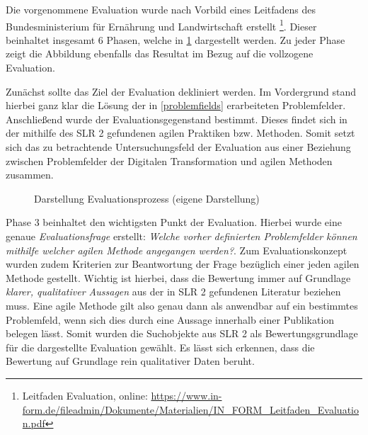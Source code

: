 Die vorgenommene Evaluation wurde nach Vorbild eines Leitfadens des Bundesministerium für Ernährung und Landwirtschaft erstellt \footnote{Leitfaden Evaluation, \newline online: \url{https://www.in-form.de/fileadmin/Dokumente/Materialien/IN_FORM_Leitfaden_Evaluation.pdf}}. Dieser beinhaltet insgesamt 6 Phasen, welche in \ref{fig:evaluation} dargestellt werden. Zu jeder Phase zeigt die Abbildung ebenfalls das Resultat im Bezug auf die  vollzogene Evaluation. 

Zunächst sollte das Ziel der Evaluation dekliniert werden. Im Vordergrund stand hierbei ganz klar die Lösung der in \ref{problemfields} erarbeiteten Problemfelder. Anschließend wurde der  Evaluationsgegenstand bestimmt. Dieses findet sich in der mithilfe des SLR 2 gefundenen agilen Praktiken bzw. Methoden. Somit setzt sich das zu betrachtende Untersuchungsfeld der Evaluation aus einer Beziehung zwischen Problemfelder der Digitalen Transformation und agilen Methoden zusammen.

\begin{figure}[H]
	\centering
	\caption[Darstellung Evaluationsprozess]{Darstellung Evaluationsprozess (eigene Darstellung)}
	\label{fig:evaluation}
\end{figure}

Phase 3 beinhaltet den wichtigsten Punkt der Evaluation. Hierbei wurde eine genaue \textit{Evaluationsfrage} erstellt: \textit{Welche vorher definierten Problemfelder können mithilfe welcher agilen Methode angegangen werden?}. Zum Evaluationskonzept wurden zudem Kriterien zur Beantwortung der Frage bezüglich einer jeden agilen Methode gestellt. Wichtig ist hierbei, dass die Bewertung immer auf Grundlage \textit{klarer, qualitativer Aussagen} aus der in SLR 2 gefundenen Literatur beziehen muss. Eine agile Methode gilt also genau dann als anwendbar auf ein bestimmtes Problemfeld, wenn sich dies durch eine Aussage innerhalb einer Publikation belegen lässt. Somit wurden die Suchobjekte aus SLR 2 als Bewertungsgrundlage für die dargestellte Evaluation gewählt.  Es lässt sich erkennen, dass die Bewertung auf Grundlage rein qualitativer Daten beruht.

